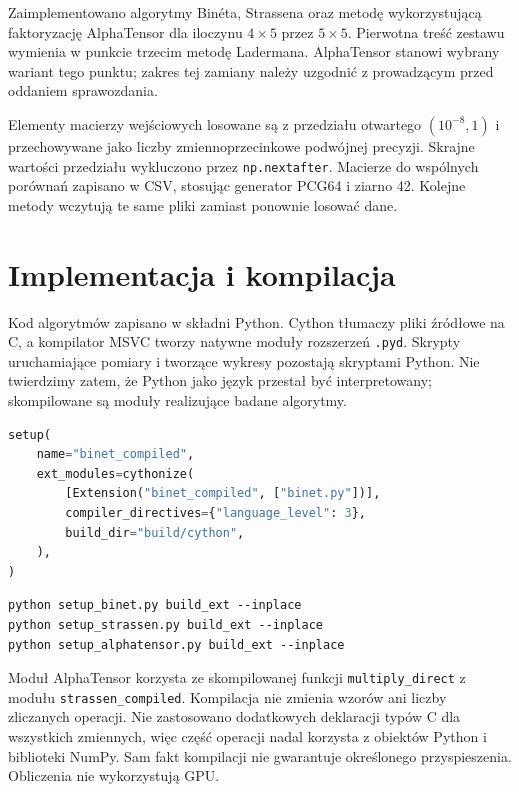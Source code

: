 \documentclass[11pt,a4paper]{article}
\begin{document}
Zaimplementowano algorytmy Binéta, Strassena oraz metodę wykorzystującą
faktoryzację AlphaTensor dla iloczynu $4\times5$ przez $5\times5$.
Pierwotna treść zestawu wymienia w punkcie trzecim metodę Ladermana.
AlphaTensor stanowi wybrany wariant tego punktu; zakres tej zamiany
należy uzgodnić z prowadzącym przed oddaniem sprawozdania.

Elementy macierzy wejściowych losowane są z przedziału otwartego
$(10^{-8},1)$ i przechowywane jako liczby zmiennoprzecinkowe
podwójnej precyzji. Skrajne wartości przedziału wykluczono przez
\texttt{np.nextafter}. Macierze do wspólnych porównań zapisano w CSV,
stosując generator PCG64 i ziarno 42. Kolejne metody wczytują te same
pliki zamiast ponownie losować dane.

\section{Implementacja i kompilacja}
Kod algorytmów zapisano w składni Python. Cython tłumaczy pliki źródłowe
na C, a kompilator MSVC tworzy natywne moduły rozszerzeń \texttt{.pyd}.
Skrypty uruchamiające pomiary i tworzące wykresy pozostają skryptami Python.
Nie twierdzimy zatem, że Python jako język przestał być interpretowany;
skompilowane są moduły realizujące badane algorytmy.

\begin{lstlisting}[language=Python,caption={Przykład konfiguracji kompilacji Binéta.}]
setup(
    name="binet_compiled",
    ext_modules=cythonize(
        [Extension("binet_compiled", ["binet.py"])],
        compiler_directives={"language_level": 3},
        build_dir="build/cython",
    ),
)
\end{lstlisting}

\begin{lstlisting}[caption={Polecenia budowania trzech modułów.}]
python setup_binet.py build_ext --inplace
python setup_strassen.py build_ext --inplace
python setup_alphatensor.py build_ext --inplace
\end{lstlisting}

Moduł AlphaTensor korzysta ze skompilowanej funkcji
\texttt{multiply\_direct} z modułu \texttt{strassen\_compiled}.
Kompilacja nie zmienia wzorów ani liczby zliczanych operacji.
Nie zastosowano dodatkowych deklaracji typów C dla wszystkich zmiennych,
więc część operacji nadal korzysta z obiektów Python i biblioteki NumPy.
Sam fakt kompilacji nie gwarantuje określonego przyspieszenia.
Obliczenia nie wykorzystują GPU.
\end{document}

